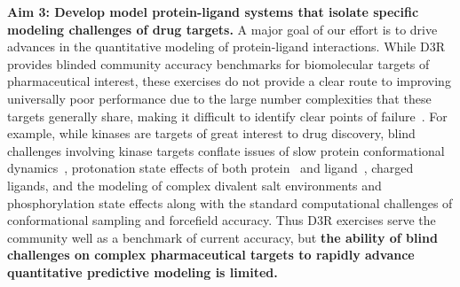 \documentclass[11pt]{article}
\begin{document}
\textbf{Aim 3: Develop model protein-ligand systems that isolate specific modeling challenges of drug targets.}
A major goal of our effort is to drive advances in the quantitative modeling of protein-ligand interactions.
While D3R~\cite{gathiaka_d3r_2016} provides blinded community accuracy benchmarks for biomolecular targets of pharmaceutical interest, these exercises do not provide a clear route to improving universally poor performance due to the large number complexities that these targets generally share, making it difficult to identify clear points of failure~\cite{ignjatovic_binding-affinity_2016, deng_large_2016, sunseri_d3r_2016, gathiaka_d3r_2016}.
For example, while kinases are targets of great interest to drug discovery, blind challenges involving kinase targets conflate issues of slow protein conformational dynamics~\cite{Lin:2013:Proc.Natl.Acad.Sci.}, protonation state effects of both protein~\cite{Shan:2009:PNAS} and ligand~\cite{Szakacs:2005:JournalofMedicinalChemistry,Grante:2014:SpectrochimicaActaPartA:MolecularandBiomolecularSpectroscopy}, charged ligands, and the modeling of complex divalent salt environments and phosphorylation state effects along with the standard computational challenges of conformational sampling and forcefield accuracy.
Thus D3R exercises serve the community well as a benchmark of current accuracy, but {\bf the ability of blind challenges on complex pharmaceutical targets to rapidly advance quantitative predictive modeling is limited.}
\end{document}
